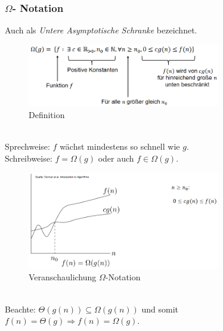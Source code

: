 \documentclass{article}
\begin{document}
            \subsubsection{$\Omega$- Notation}
                Auch als \textit{Untere Asymptotische Schranke} bezeichnet.\\
                \begin{figure}[ht]
                    \centering
                    \includegraphics[width=0.75\textwidth]{Bilder/OmegaN.png}
                    \caption{Definition}
                    \label{fig:OmegaN}
                \end{figure}\\
                Sprechweise: $f$ wächst mindestens so schnell wie $g$.\\
                Schreibweise: $f=\Omega(g)$ oder auch $f\in \Omega(g)$.\\
                \begin{figure}[ht]
                    \centering
                    \includegraphics[width=0.75\textwidth]{Bilder/VeranschaulichungOmega.png}
                    \caption{Veranschaulichung $\Omega$-Notation}
                    \label{fig:VeranschaulichungOmega}
                \end{figure}\\
                \newpage
                Beachte: $\Theta(g(n)) \subseteq \Omega(g(n))$ und somit $f(n)=\Theta(g)\Rightarrow f(n)=\Omega(g)$.\\
\end{document}
